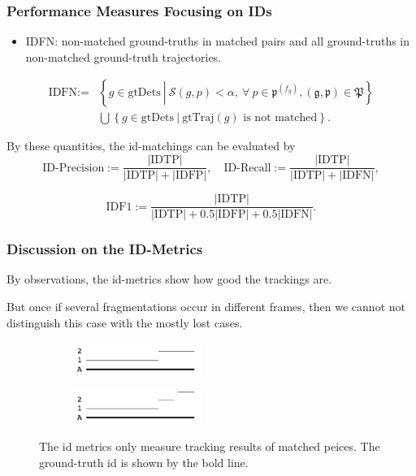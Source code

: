 \documentclass[slidetop, mathserif]{beamer}
\begin{document}
\begin{frame}
	\frametitle{Performance Measures Focusing on IDs}
	\begin{itemize}
		\item IDFN:
		      non-matched ground-truths in matched pairs and
		      all ground-truths in non-matched ground-truth trajectories.
	\end{itemize}

	\vspace{-15pt}
	\begin{align*}
		\text{IDFN} := & \left\{ g\in\text{gtDets}\ \left|\                                                
		\mathcal S(g,p)<\alpha, \ 
		\forall\ p\in\mathfrak p^{(f_g)},
		(\mathfrak g,\mathfrak p)\in\mathfrak P
		\right.
		\right\} \\
		               & \bigcup \left\{g \in \text{gtDets}\ |\ \text{gtTraj$(g)$ is not matched}\right\}. 
	\end{align*}
	
	By these quantities, the id-matchings can be evaluated by
	\[
		\text{ID-Precision} := \dfrac{|\text{IDTP}|}{|\text{IDTP}| + |\text{IDFP}|},
		\quad
		\text{ID-Recall} := \dfrac{|\text{IDTP}|}{|\text{IDTP}| + |\text{IDFN}|},
	\]

	\vspace{-10pt}
	\[
		\text{IDF1} := \dfrac{|\text{IDTP}|}{|\text{IDTP}| + 0.5|\text{IDFP}| + 0.5|\text{IDFN}|}.
	\]
\end{frame}

\begin{frame}
	\frametitle{Discussion on the ID-Metrics}
			
	By observations, the id-metrics show how good the trackings are.

	\quad

	But once if several fragmentations occur in different frames,
	then we cannot not distinguish this case with the mostly lost cases.

	\vspace{5pt}
			
	\begin{figure}
		\begin{subfigure}{.5\textwidth}
			\centering
			\includegraphics[width=120pt]{pics/fig6.png}
		\end{subfigure}%
		\begin{subfigure}{.5\textwidth}
			\centering
			\includegraphics[width=120pt]{pics/fig7.png}
		\end{subfigure}
		\caption{The id metrics only measure tracking results of matched peices.
		The ground-truth id is shown by the bold line.}
	\end{figure}
			
\end{frame}
\end{document}
